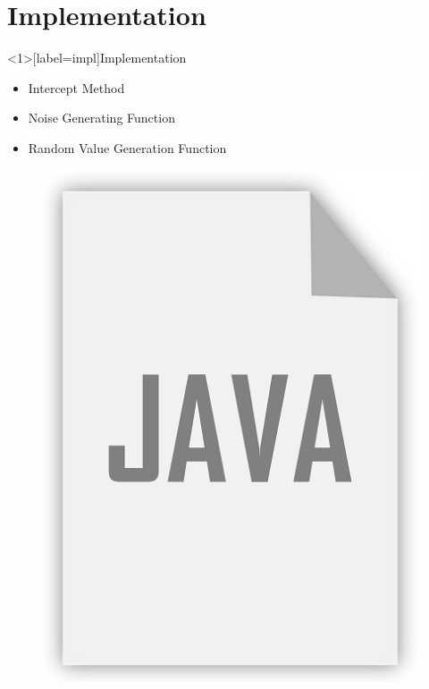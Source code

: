\documentclass[aspectratio=169]{beamer}
[aspectratio=169] %
\begin{document}
\section{Implementation}

\begin{frame}<1>[label=impl]{Implementation}
  \begin{minipage}{0.49\textwidth} 
    \begin{itemize}
      \item Intercept Method
      \pause
      \item Noise Generating Function
      \pause
      \item Random Value Generation Function
    \end{itemize}
  \end{minipage}
  \hfill
  \begin{minipage}{0.49\textwidth} 
    \begin{figure}
      \centering
      \includegraphics[height=0.5\textheight]{figures/java.png}
    \end{figure}
  \end{minipage}
\end{frame}
\end{document}

